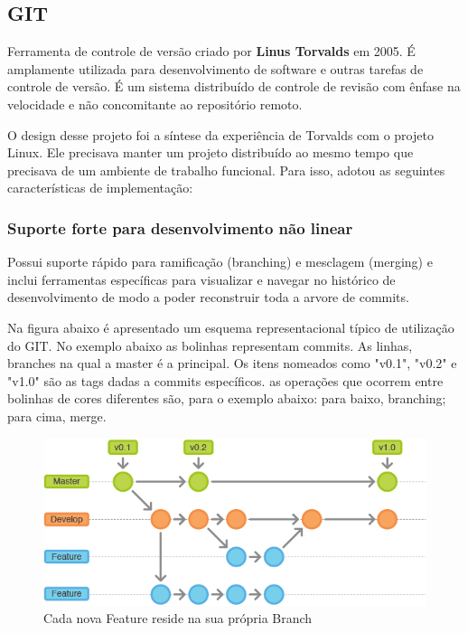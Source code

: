 \documentclass[
	article,			%
	12pt,				%
	oneside,			%
	a4paper,			%
	english,			
	brazil,
	sumario=tradicional
	]{abntex2}
\begin{document}
\subsection{GIT}


Ferramenta de controle de versão criado por \textbf{Linus Torvalds} em 2005. É amplamente utilizada para desenvolvimento de software e outras tarefas de controle de versão. É um sistema distribuído de controle de revisão com ênfase na velocidade e não concomitante ao repositório remoto. 

O design desse projeto foi a síntese da experiência de Torvalds com o projeto Linux. Ele precisava manter um projeto distribuído ao mesmo tempo que precisava de um ambiente de trabalho funcional. Para isso, adotou as seguintes características de implementação:

\subsubsection{Suporte forte para desenvolvimento não linear}
Possui suporte rápido para ramificação (branching) e mesclagem (merging) e inclui ferramentas específicas para visualizar e navegar no histórico de desenvolvimento de modo a poder reconstruir toda a arvore de commits.

Na figura abaixo é apresentado um esquema representacional típico de utilização do GIT. No exemplo abaixo as bolinhas representam commits. As linhas, branches na qual a master é a principal. Os itens nomeados como "v0.1", "v0.2" e "v1.0" são as tags dadas a commits específicos. as operações que ocorrem entre bolinhas de cores diferentes são, para o exemplo abaixo: para baixo, branching; para cima, merge.

\begin{figure}[!h]
\centering
\includegraphics[scale=0.5]{images/git_workflow2.png}
\caption{Cada nova Feature reside na sua própria Branch \cite[Feature Branch]{atlassiangit.1}}
\label{img_git_workflow}
\end{figure}
\end{document}
